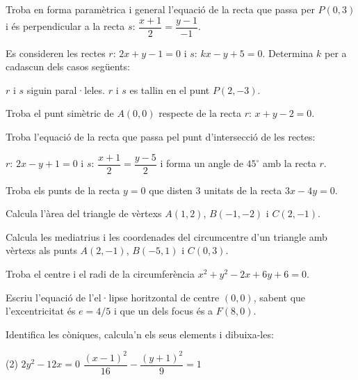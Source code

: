 \begin{mylist}
\exer[2] Troba en forma paramètrica i general l'equació de la recta que passa per $P(0,3)$ i és perpendicular a la recta $s: \, \dfrac{x+1}{2}=\dfrac{y-1}{-1}$.

\exer[2]  Es consideren les rectes $r:\, 2x+y-1=0$ i $s:\, kx-y+5=0$. Determina $k$ per a cadascun dels casos següents:
 \begin{tasks}
	\task $r$ i $s$ siguin paral·leles.
	\task $r$ i $s$ es tallin en el punt $P(2,-3)$.
\end{tasks}

\exer[2] Troba el punt simètric de $A(0,0)$ respecte de la recta $r:\, x+y-2=0$.

\exer[2] Troba l'equació de la recta que passa pel punt d'intersecció de les rectes: 

$r:\, 2x-y+1=0$ i $s: \, \dfrac{x+1}{2}=\dfrac{y-5}{2}$ i forma un angle de $45^\circ$ amb la recta $r$.

\exer[2] Troba els punts de la recta $y=0$ que disten 3 unitats de la recta $3x-4y=0$.

\exer[2] Calcula l'àrea del triangle de vèrtexs $A(1,2)$, $B(-1,-2)$ i $C(2,-1)$.

\exer[2] Calcula les mediatrius i les coordenades del circumcentre d'un triangle amb vèrtexs als punts $A(2,-1)$, $B(-5,1)$  i $C(0,3)$.

\exer[2] Troba el centre i el radi de la circumferència $x^2+y^2-2x+6y+6=0$.

\exer[2] Escriu l'equació de l'el·lipse horitzontal de centre $(0,0)$, sabent que l'excentricitat és $e=4/5$ i que un dels focus és a $F(8,0)$.

\exer[2] Identifica les còniques, calcula'n els seus elements i dibuixa-les:
 \begin{tasks}(2)
	\task $2y^2-12x=0$
	\task $\dfrac{(x-1)^2}{16}-\dfrac{(y+1)^2}{9}=1$
\end{tasks}
\end{mylist}
